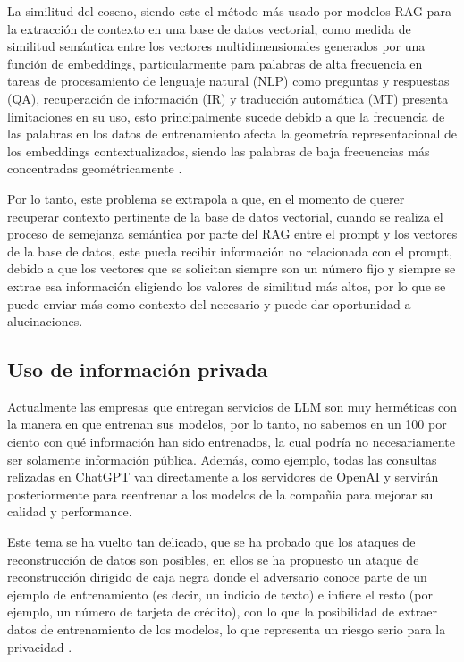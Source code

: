 La similitud del coseno, siendo este el método más usado por modelos RAG para la extracción de contexto en una base de datos vectorial, 
como medida de similitud semántica entre los vectores multidimensionales generados por una función de embeddings, particularmente para palabras de alta frecuencia en tareas de 
procesamiento de lenguaje natural (NLP) como preguntas y respuestas (QA), recuperación de información (IR) y traducción 
automática (MT) presenta limitaciones en su uso, esto principalmente sucede debido a que la frecuencia de las palabras en los 
datos de entrenamiento afecta la geometría representacional de los embeddings contextualizados, siendo las palabras de baja 
frecuencias más concentradas geométricamente \cite{coseno}.

Por lo tanto, este problema se extrapola a que, en el momento de querer recuperar contexto pertinente de la base de datos vectorial, 
cuando se realiza el proceso de semejanza semántica por parte del RAG entre el prompt y los vectores de la base de datos, este pueda recibir 
información no relacionada con el prompt, debido a que los vectores que se solicitan siempre son un número fijo y siempre se extrae esa información eligiendo los valores de similitud más altos, por lo que se puede enviar más como contexto del necesario y puede dar oportunidad a alucinaciones.

\subsection{Uso de información privada}

Actualmente las empresas que entregan servicios de LLM son muy herméticas con la manera en que entrenan sus modelos, por lo tanto, no sabemos en un 100 por ciento
con qué información han sido entrenados, la cual podría no necesariamente ser solamente información pública. Además, como ejemplo, todas las consultas relizadas en ChatGPT van directamente a los servidores de OpenAI y servirán posteriormente para reentrenar a los modelos de la compañia para mejorar su calidad y performance.

Este tema se ha vuelto tan delicado, que se ha probado que los ataques de reconstrucción de datos son posibles, en ellos se ha propuesto un ataque de reconstrucción dirigido de caja negra donde el 
adversario conoce parte de un ejemplo de entrenamiento (es decir, un indicio de texto) e infiere el resto (por ejemplo, un número de tarjeta de crédito), 
con lo que la posibilidad de extraer datos de entrenamiento de los modelos, lo que representa un riesgo serio para la privacidad \cite{privacidad1}. 

